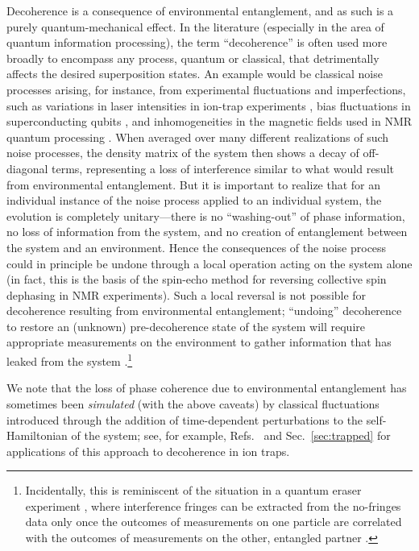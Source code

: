\documentclass[3p,sort&compress,12pt]{elsarticle}
\begin{document}
Decoherence is a consequence of environmental entanglement, and as such is a purely quantum-mechanical effect. In the literature (especially in the area of quantum information processing), the term ``decoherence'' is often used more broadly to encompass any process, quantum or classical, that detrimentally affects the desired superposition states. An example would be classical noise processes arising, for instance, from experimental fluctuations and imperfections, such as variations in laser intensities in ion-trap experiments \cite{Schneider:1998:yz,Miquel:1997:zz}, bias fluctuations in superconducting qubits \cite{Martinis:2003:bz}, and inhomogeneities in the magnetic fields used in NMR quantum processing \cite{Vandersypen:2004:ra}. When averaged over many different realizations of such noise processes, the density matrix of the system then shows a decay of off-diagonal terms, representing a loss of interference similar to what would result from environmental entanglement. But it is important to realize that for an individual instance of the noise process applied to an individual system, the evolution is completely unitary---there is no ``washing-out'' of phase information, no loss of information from the system, and no creation of entanglement between the system and an environment. Hence the consequences of the noise process could in principle be undone through a local operation acting on the system alone (in fact, this is the basis of the spin-echo method for reversing collective spin dephasing in NMR experiments). Such a local reversal is not possible for decoherence resulting from environmental entanglement; ``undoing'' decoherence to restore an (unknown) pre-decoherence state of the system will require appropriate measurements on the environment to gather information that has leaked from the system \cite{Myatt:2000:yy,Zurek:2002:ii}.\footnote{Incidentally, this is reminiscent of the situation in a quantum eraser experiment \cite{Jaynes:1980:lm,Peres:1980:im,Scully:1982:yb,Scully:1991:yb}, where interference fringes can be extracted from the no-fringes data only once the outcomes of measurements on one particle are correlated with the outcomes of measurements on the other, entangled partner \cite{Englert:1999:aq,Ashby:2016:pp}.}

We note that the loss of phase coherence due to environmental entanglement has sometimes been \emph{simulated} (with the above caveats) by classical fluctuations introduced through the addition of time-dependent perturbations to the self-Hamiltonian of the system; see, for example,  Refs.~\cite{Schneider:1998:yz,Schneider:1999:tt,Turchette:2000:aa,Myatt:2000:yy} and Sec.~\ref{sec:trapped} for applications of this approach to decoherence in ion traps.
\end{document}
